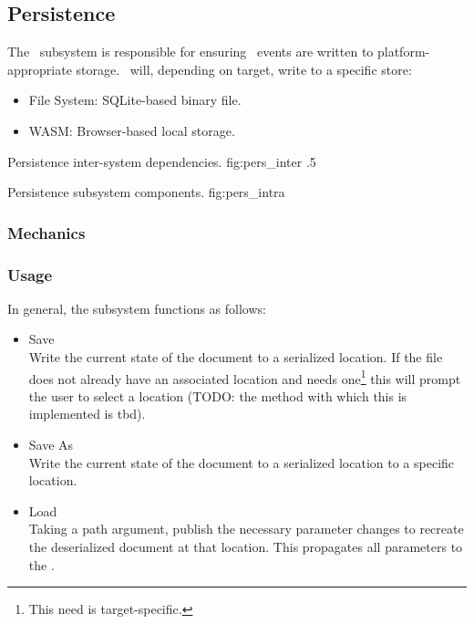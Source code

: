 \subsection{Persistence}
The \permod\ subsystem is responsible for ensuring \docdtype\ events are written to platform-appropriate storage.
\permod\ will, depending on target, write to a specific store:
\begin{itemize}
      \item File System: SQLite-based binary file.
      \item WASM: Browser-based local storage.
\end{itemize}

{Persistence inter-system dependencies.}
{fig:pers_inter}
{.5}

{Persistence subsystem components.}
{fig:pers_intra}
{}


\subsubsection{Mechanics}



\subsubsection{Usage}
In general, the subsystem functions as follows:
\begin{itemize}
      \item Save \\
            Write the current state of the document to a serialized location.
            If the file does not already have an associated location and needs one\footnote{This need is target-specific.} this will prompt the user to select a location (TODO: the method with which this is implemented is tbd).
      \item Save As \\
            Write the current state of the document to a serialized location to a specific location.
      \item Load \\
            Taking a path argument, publish the necessary parameter changes to recreate the deserialized document at that location.
            This propagates all parameters to the \docftype.
\end{itemize}